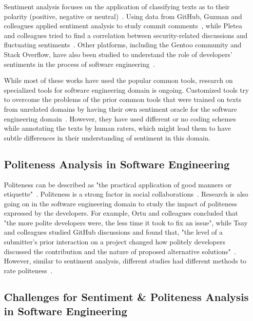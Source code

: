 Sentiment analysis focuses on the application of 
classifying texts as to their polarity 
(positive, negative or neutral)~\cite{pang2008opinion}. 
Using data from GitHub, 
Guzman and colleagues applied sentiment analysis 
to study commit comments~\cite{guzman2014sentiment}, 
while Pletea and colleagues tried to find a correlation between security-related discussions and fluctuating sentiments~\cite{pletea2014security}. 
Other platforms, 
including the Gentoo community and Stack Overflow, 
have also been studied to understand the role of developers' sentiments in the process of software engineering~\cite{garcia2013role,islam2016towards,guzman2013towards,novielli2014towards}.

While most of these works have used 
the popular common tools, 
research on specialized tools for software engineering domain 
is ongoing. 
Customized tools try to overcome the problems 
of the prior common tools 
that were trained on texts 
from unrelated domains 
by having their own sentiment oracle 
for the software engineering domain~\cite{ahmed2017senticr,calefato2017sentiment}. 
However, they have used different or no coding schemes 
while annotating the texts by human raters, 
which might lead them to have subtle differences in their understanding of sentiment in this domain.

\subsection{Politeness Analysis in Software Engineering}

Politeness can be described as 
"the practical application of good manners or etiquette"~\cite{wiki:pol}. 
Politeness is a strong factor in social collaborations~\cite{ortu2015would,wang2008politeness}. 
Research is also going on in the software engineering domain 
to study the impact of politeness expressed by the developers. 
For example, Ortu and colleagues concluded that 
"the more polite developers were, 
the less time it took to fix an issue", 
while Tsay and colleagues studied GitHub discussions 
and found that, 
"the level of a submitter's prior interaction on a project changed how politely developers discussed the contribution and the nature of proposed alternative solutions"~\cite{ortu2015would,tsay2014let}. However, similar to sentiment analysis, different studies had different methods to rate politeness~\cite{tsay2014let,brownsoftware}.


\subsection{Challenges for Sentiment \& Politeness Analysis in Software Engineering}

